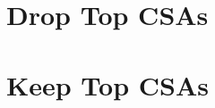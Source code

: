 \documentclass[11pt]{article}
\begin{document}
\section*{Drop Top CSAs}


\vspace{1em}

\section*{Keep Top CSAs}

\end{document}
